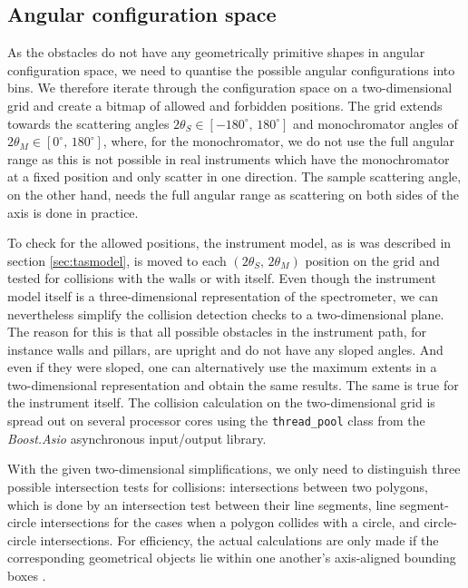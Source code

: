 \subsection{Angular configuration space}
\label{sec:angular_config_space}
As the obstacles do not have any geometrically primitive shapes in angular configuration space, we need to quantise
the possible angular configurations into bins. We therefore iterate through the configuration space on a two-dimensional 
grid and create a bitmap of allowed and forbidden positions. The grid extends towards the scattering angles 
$2\theta_S \in \left[ -180^{\circ},\, 180^{\circ} \right]$ and monochromator angles of 
$2\theta_M \in \left[0^{\circ},\, 180^{\circ} \right]$, where, for the monochromator, we do
not use the full angular range as this is not possible in real instruments which have the monochromator at a 
fixed position and only scatter in one direction. The sample scattering angle, on the other hand, needs the full 
angular range as scattering on both sides of the axis is done in practice.

To check for the allowed positions, the instrument model, as is was described in section \ref{sec:tasmodel}, is moved to
each $\left( 2\theta_S,\, 2\theta_M \right)$ position on the grid and tested for collisions with the walls or with
itself. Even though the instrument model itself is a three-dimensional representation of the spectrometer, we
can nevertheless simplify the collision detection checks to a two-dimensional plane. The reason for this is
that all possible obstacles in the instrument path, for instance walls and pillars, are upright and do not have
any sloped angles. And even if they were sloped, one can alternatively use the maximum extents in a two-dimensional 
representation and obtain the same results. The same is true for the instrument itself.
The collision calculation on the two-dimensional grid is spread out on several processor cores using the 
\lstinline[language=C++]|thread_pool| \cite{web_boost_asio_threadpool} class from the 
\textit{Boost.Asio} \cite{web_boost_asio} asynchronous input/output library.

With the given two-dimensional simplifications, we only need to distinguish three possible 
intersection tests for collisions: intersections between two polygons, which is done by an intersection
test between their line segments, line segment-circle intersections for the cases when a polygon 
collides with a circle, and circle-circle intersections. 
For efficiency, the actual calculations are only made if the corresponding geometrical objects lie within 
one another's axis-aligned bounding boxes \cite{web_aabb}.

